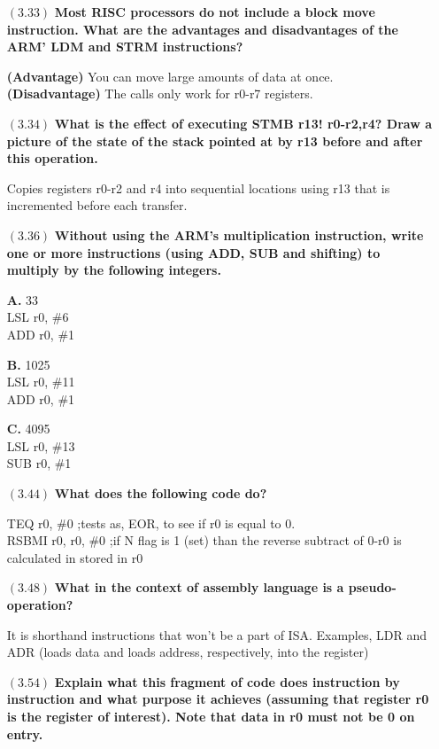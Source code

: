 \documentclass[letterpaper,10pt,titlepage]{article}
\begin{document}
\begin{enumerate}
\item[$(3.33)$] \textbf{Most RISC processors do not include a block move instruction. What are the advantages and disadvantages of the ARM' LDM and STRM instructions?}

\textbf{(Advantage)} You can move large amounts of data at once.\\
\textbf{(Disadvantage)} The calls only work for r0-r7 registers.

\item[$(3.34)$] \textbf{What is the effect of executing STMB r13! {r0-r2,r4}? Draw a picture of the state of the stack pointed at by r13 before and after this operation.}

Copies registers r0-r2 and r4 into sequential locations using r13 that is incremented before each transfer.

\item[$(3.36)$] \textbf{Without using the ARM's multiplication instruction, write one or more instructions (using ADD, SUB and shifting) to multiply by the following integers.}

\textbf{A.} 33\\
LSL r0, \#6\\
ADD r0, \#1

\textbf{B.} 1025\\
 	LSL r0, \#11\\
	ADD r0, \#1

\textbf{C.} 4095\\
 	LSL r0, \#13\\
	SUB r0, \#1

\item[$(3.44)$] \textbf{What does the following code do?}

	TEQ r0, \#0		;tests as, EOR, to see if r0 is equal to 0.\\
	RSBMI r0, r0, \#0	;if N flag is 1 (set) than the reverse subtract of 0-r0 is calculated in stored in r0
	
\item[$(3.48)$] \textbf{What in the context of assembly language is a pseudo-operation?}

It is shorthand instructions that won't be a part of ISA. Examples, LDR and ADR (loads data and loads address, respectively, into the register)

\item[$(3.54)$] \textbf{Explain what this fragment of code does instruction by instruction and what purpose it achieves (assuming that register r0 is the register of  interest). Note that data in r0 must not be 0 on entry.}


\end{enumerate}
\end{document}
